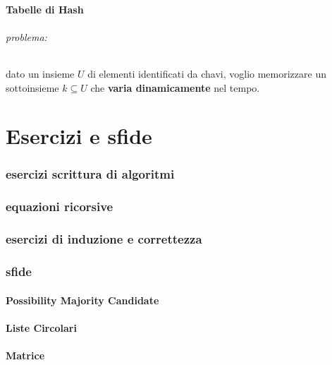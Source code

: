 \documentclass{article}
\begin{document}
\subsection{Tabelle di Hash} %
\paragraph{problema:} dato un insieme $U$ di elementi identificati da chavi, voglio memorizzare un sottoinsieme $k \subseteq U$ che \textbf{varia dinamicamente} nel tempo.

\part{Esercizi e sfide}
\section{esercizi scrittura di algoritmi}
\section{equazioni ricorsive}
\section{esercizi di induzione e correttezza}
\section{sfide}
\subsection{Possibility Majority Candidate}
\subsection{Liste Circolari}
\subsection{Matrice}
\end{document}
